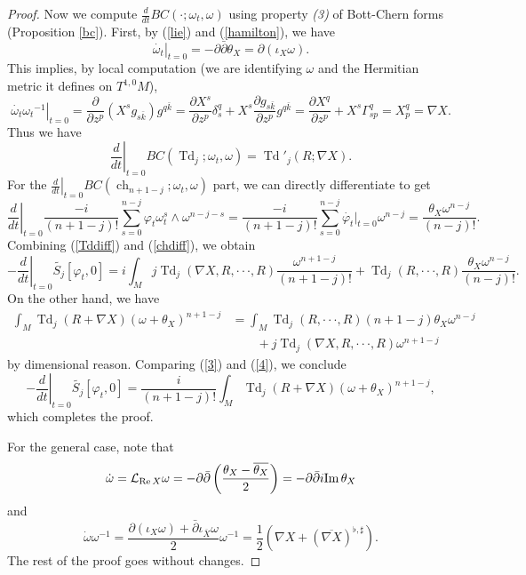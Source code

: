 \documentclass[12pt,reqno,a4paper]{amsart}
\numberwithin{equation}{section}
\def\bk{\bar k}
\def\p{\partial}
\def\bp{\bar\partial}
\DeclareMathOperator{\Td}{Td}
\DeclareMathOperator{\ch}{ch}
\def\Im{{\rm Im\,}}
\def\re{{\rm Re\,}}
\theoremstyle{remark}
\theoremstyle{dotless}
\begin{document}
\begin{proof}
Now we compute $\frac{d}{dt}BC(\cdot;\omega_t,\omega)$ using property \textit{(3)} of Bott-Chern forms (Proposition \ref{bc}).
First, by (\ref{lie}) and (\ref{hamilton}), we have
\begin{equation*}
\left.\dot{\omega_t}\right|_{t=0}=-\p\bp\theta_X=\p(\iota_X \omega).
\end{equation*}
This implies, by local computation (we are identifying $\omega$ and the Hermitian metric it defines on $T^{1,0}M$),
\begin{equation*}
\left.\dot{\omega_t}{\omega_t}^{-1}\right|_{t=0}=\frac{\p}{\p z^p} \left( X^s g_{s\bk} \right) g^{q\bk}=\frac{\p X^s}{\p z^p}\delta^q_s+X^s\frac{\p g_{s\bk}}{\p z^p}g^{q\bk}=\frac{\p X^q}{\p z^p}+X^s\Gamma^{q}_{sp}=X^q_p=\nabla X.
\end{equation*}
Thus we have
\begin{equation}\label{Tddiff}
\left.\frac{d}{dt}\right|_{t=0}BC(\Td_j;\omega_t,\omega)=\Td'_j(R;\nabla X).
\end{equation}
For the $\left.\frac{d}{dt}\right|_{t=0}BC(\ch_{n+1-j};\omega_t,\omega)$ part, we can directly differentiate to get
\begin{equation}\label{chdiff}
\left.\frac{d}{dt}\right|_{t=0}\frac{-i}{(n+1-j)!}\sum^{n-j}_{s=0}\varphi_t \omega_{t}^s\wedge \omega^{n-j-s}=\frac{-i}{(n+1-j)!}\sum^{n-j}_{s=0}\dot{\varphi_t}|_{t=0}\omega^{n-j}=\frac{\theta_X \omega^{n-j}}{(n-j)!}.
\end{equation}
Combining (\ref{Tddiff}) and (\ref{chdiff}), we obtain
\begin{equation}\label{3}
\left.-\frac{d}{dt}\right|_{t=0}\widetilde{S_j}[\varphi_t,0]=i\int_M j\Td_j (\nabla X,R,\cdot\cdot\cdot,R)\frac{\omega^{n+1-j}}{(n+1-j)!}+\Td_j(R,\cdot\cdot\cdot,R)\frac{\theta_X \omega^{n-j}}{(n-j)!}.
\end{equation}
On the other hand, we have
\begin{align}\label{4}
\int_M \Td_j(R+\nabla X)(\omega+\theta_X)^{n+1-j}&=\int_M \Td_j(R,\cdot\cdot\cdot,R)(n+1-j)\theta_X \omega^{n-j} \nonumber\\
&\qquad+j\Td_j(\nabla X,R,\cdot\cdot\cdot,R)\omega^{n+1-j}
\end{align}
by dimensional reason. Comparing (\ref{3}) and (\ref{4}), we conclude
\begin{equation*}
\left.-\frac{d}{dt}\right|_{t=0}\widetilde{S_j}[\varphi_t,0]=\frac{i}{(n+1-j)!}\int_M \Td_j(R+\nabla X)(\omega+\theta_X)^{n+1-j},
\end{equation*}
which completes the proof. 

For the general case, note that
\begin{equation*}
\dot{\omega}=\mathcal{L}_{\re X}\omega=-\p\bp\left(\frac{\theta_X-\overline{\theta_X}}{2}\right)=-\p\bp i\Im \theta_X 
\end{equation*}
and
\begin{equation*}
\dot{\omega}{\omega}^{-1}=\frac{\p(\iota_X \omega)+\bp \iota_{\overline{X}} \omega}{2}{\omega}^{-1}=\frac12(\nabla X +(\overline{\nabla X})^{\flat,\sharp}).
\end{equation*}
The rest of the proof goes without changes.
\end{proof}
\end{document}
